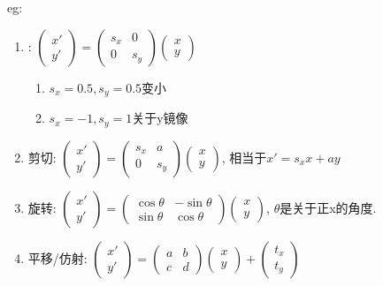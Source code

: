 \begin{enumerate}
        eg:
        \begin{enumerate}
            \item {}: $\begin{pmatrix}x'\\y'\end{pmatrix}=\begin{pmatrix}s_x&0\\0&s_y\end{pmatrix}\begin{pmatrix}x\\y\end{pmatrix}$
            \begin{enumerate}
                \item $s_x=0.5, s_y=0.5$变小
                \item $s_x=-1, s_y=1$关于y镜像
            \end{enumerate}
            \item 剪切: $\begin{pmatrix}
                x'\\
                y'
            \end{pmatrix}=\begin{pmatrix}
                s_x&a\\
                0&s_y
            \end{pmatrix}\begin{pmatrix}
                x\\
                y
            \end{pmatrix}$, 相当于$x'=s_xx+ay$
            \item 旋转: $\begin{pmatrix}
                x'\\
                y'
            \end{pmatrix}=\begin{pmatrix}
                \cos \theta & -\sin \theta\\
                \sin \theta&\cos \theta
            \end{pmatrix}\begin{pmatrix}
                x\\
                y
            \end{pmatrix}$, $\theta$是关于正x的角度.
            \item 平移/仿射: $\begin{pmatrix}
                x'\\
                y'
            \end{pmatrix}=\begin{pmatrix}
                a& b\\
                c&d
            \end{pmatrix}\begin{pmatrix}
                x\\
                y
            \end{pmatrix}+\begin{pmatrix}
                t_x\\ t_y
            \end{pmatrix}$ 
            

\end{enumerate}
\end{enumerate}
